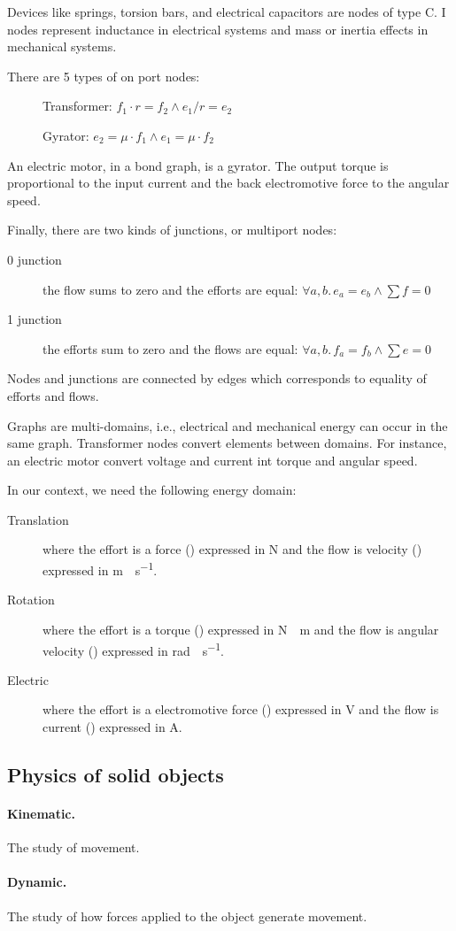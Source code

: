 Devices like springs, torsion bars, and electrical capacitors are nodes of type C.
I nodes represent inductance in electrical systems and mass or inertia effects in mechanical systems.

There are 5 types of on port nodes:
\begin{description}
\item[\bgTF] Transformer: $f_1 \cdot r = f_2 \land e_1/r = e_2$
\item[\bgGY] Gyrator: $e_2 = \mu \cdot f_1 \land e_1 = \mu \cdot f_2$
\end{description}
    
An electric motor, in a bond graph, is a gyrator.
The output torque is proportional to the input current and the back electromotive force to the angular speed.


Finally, there are two kinds of junctions, or multiport nodes:
\begin{description}
\item[0 junction] the flow sums to zero and the efforts are equal: $\forall a,b.\, e_a = e_b \land \sum f = 0$
\item[1 junction] the efforts sum to zero and the flows are equal: $\forall a,b.\, f_a = f_b \land \sum e = 0$
\end{description}

Nodes and junctions are connected by edges which corresponds to equality of efforts and flows.

Graphs are multi-domains, i.e., electrical and mechanical energy can occur in the same graph.
Transformer nodes convert elements between domains.
For instance, an electric motor convert voltage and current int torque and angular speed.
    
In our context, we need the following energy domain:
\begin{description}
\item[Translation] where the effort is a force (\force) expressed in \unit{N} and the flow is velocity (\velocity) expressed in \unit{m \cdot s^{-1}}.
\item[Rotation] where the effort is a torque (\torque) expressed in \unit{N \cdot m} and the flow is angular velocity (\angularVelocity) expressed in \unit{rad \cdot s^{-1}}.
\item[Electric] where the effort is a electromotive force (\voltage) expressed in \unit{V} and the flow is current (\current) expressed in \unit{A}.
\end{description}

\subsection{Physics of solid objects}

\paragraph{Kinematic.}
The study of movement.

\paragraph{Dynamic.}
The study of how forces applied to the object generate movement.

